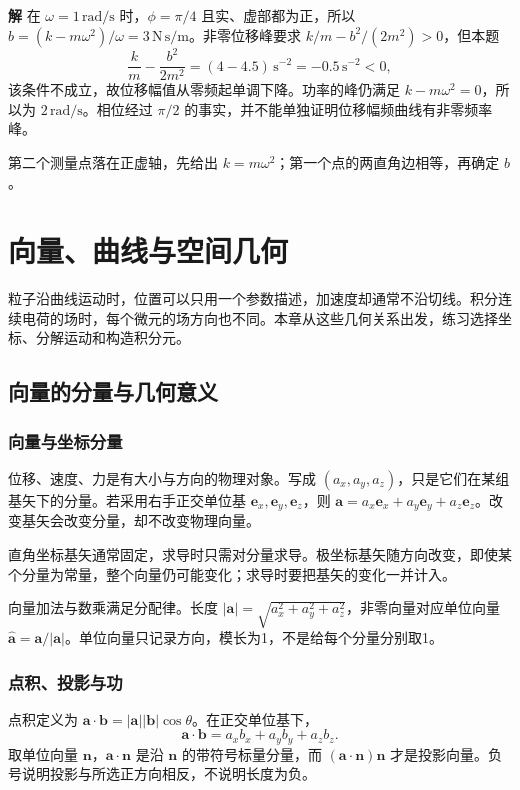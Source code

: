 \documentclass[11pt,openany,fontset=fandol]{ctexbook}
\theoremstyle{plain}\newtheorem{theorem}{定理}[chapter]\newtheorem{proposition}[theorem]{命题}
\theoremstyle{definition}\newtheorem{definition}{定义}[chapter]\newtheorem{example}{例}[chapter]
\theoremstyle{remark}\newtheorem*{remark}{说明}
\newcommand{\SolutionStart}{\par\nobreak\medskip\nobreak\noindent\textbf{解}\quad\ignorespaces}
\newenvironment{solution}{\SolutionStart}{\par\medskip}
\newcommand{\vct}[1]{\bm{#1}}\newcommand{\Rea}{\operatorname{Re}}\newcommand{\Ima}{\operatorname{Im}}
\begin{document}
\begin{enumerate}[label=1.\arabic*]
\begin{solution}
在 $\omega=1\,\mathrm{rad/s}$ 时，$\phi=\pi/4$ 且实、虚部都为正，所以 $b=(k-m\omega^2)/\omega=3\,\mathrm{N\,s/m}$。非零位移峰要求 $k/m-b^2/(2m^2)>0$，但本题
\[
\frac km-\frac{b^2}{2m^2}=(4-4.5)\,\mathrm{s^{-2}}=-0.5\,\mathrm{s^{-2}}<0,
\]
该条件不成立，故位移幅值从零频起单调下降。功率的峰仍满足 $k-m\omega^2=0$，所以为 $2\,\mathrm{rad/s}$。相位经过 $\pi/2$ 的事实，并不能单独证明位移幅频曲线有非零频率峰。

第二个测量点落在正虚轴，先给出 $k=m\omega^2$；第一个点的两直角边相等，再确定 $b$。
\end{solution}

\end{enumerate}

\chapter{向量、曲线与空间几何}
粒子沿曲线运动时，位置可以只用一个参数描述，加速度却通常不沿切线。积分连续电荷的场时，每个微元的场方向也不同。本章从这些几何关系出发，练习选择坐标、分解运动和构造积分元。

\section{向量的分量与几何意义}
\subsection{向量与坐标分量}
位移、速度、力是有大小与方向的物理对象。写成 $(a_x,a_y,a_z)$，只是它们在某组基矢下的分量。若采用右手正交单位基 $\vct e_x,\vct e_y,\vct e_z$，则 $\vct a=a_x\vct e_x+a_y\vct e_y+a_z\vct e_z$。改变基矢会改变分量，却不改变物理向量。

直角坐标基矢通常固定，求导时只需对分量求导。极坐标基矢随方向改变，即使某个分量为常量，整个向量仍可能变化；求导时要把基矢的变化一并计入。

向量加法与数乘满足分配律。长度 $|\vct a|=\sqrt{a_x^2+a_y^2+a_z^2}$，非零向量对应单位向量 $\hat{\vct a}=\vct a/|\vct a|$。单位向量只记录方向，模长为1，不是给每个分量分别取1。

\subsection{点积、投影与功}
点积定义为 $\vct a\cdot\vct b=|\vct a||\vct b|\cos\theta$。在正交单位基下，
\begin{equation}
\vct a\cdot\vct b=a_xb_x+a_yb_y+a_zb_z.
\end{equation}
取单位向量 $\vct n$，$\vct a\cdot\vct n$ 是沿 $\vct n$ 的带符号标量分量，而 $(\vct a\cdot\vct n)\vct n$ 才是投影向量。负号说明投影与所选正方向相反，不说明长度为负。
\end{document}
